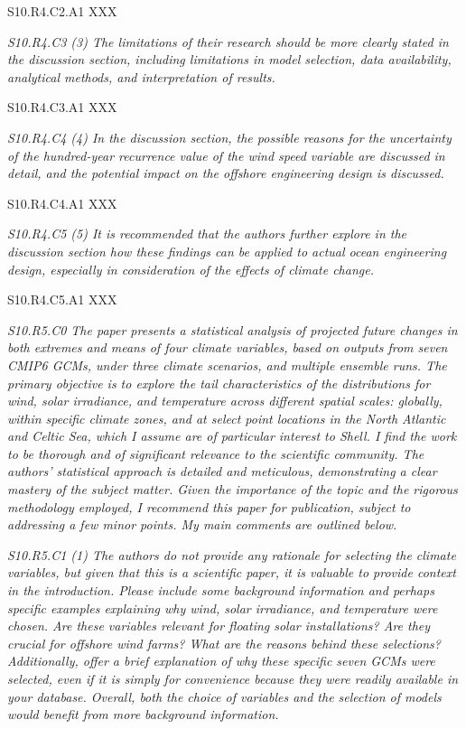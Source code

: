 \documentclass[a4paper,10pt]{article}
\begin{document}
	S10.R4.C2.A1 XXX

	\emph{S10.R4.C3 (3) The limitations of their research should be more clearly stated in the discussion section, including limitations in model selection, data availability, analytical methods, and interpretation of results.}

	S10.R4.C3.A1 XXX

	\emph{S10.R4.C4 (4) In the discussion section, the possible reasons for the uncertainty of the hundred-year recurrence value of the wind speed variable are discussed in detail, and the potential impact on the offshore engineering design is discussed.}

	S10.R4.C4.A1 XXX

	\emph{S10.R4.C5 (5) It is recommended that the authors further explore in the discussion section how these findings can be applied to actual ocean engineering design, especially in consideration of the effects of climate change.}

	S10.R4.C5.A1 XXX

	\emph{S10.R5.C0 The paper presents a statistical analysis of projected future changes in both extremes and means of four climate variables, based on outputs from seven CMIP6 GCMs, under three climate scenarios, and multiple ensemble runs. The primary objective is to explore the tail characteristics of the distributions for wind, solar irradiance, and temperature across different spatial scales: globally, within specific climate zones, and at select point locations in the North Atlantic and Celtic Sea, which I assume are of particular interest to Shell. I find the work to be thorough and of significant relevance to the scientific community. The authors' statistical approach is detailed and meticulous, demonstrating a clear mastery of the subject matter. Given the importance of the topic and the rigorous methodology employed, I recommend this paper for publication, subject to addressing a few minor points. My main comments are outlined below.}

	\emph{S10.R5.C1 (1) The authors do not provide any rationale for selecting the climate variables, but given that this is a scientific paper, it is valuable to provide context in the introduction. Please include some background information and perhaps specific examples explaining why wind, solar irradiance, and temperature were chosen. Are these variables relevant for floating solar installations? Are they crucial for offshore wind farms? What are the reasons behind these selections? Additionally, offer a brief explanation of why these specific seven GCMs were selected, even if it is simply for convenience because they were readily available in your database. Overall, both the choice of variables and the selection of models would benefit from more background information.}
\end{document}
